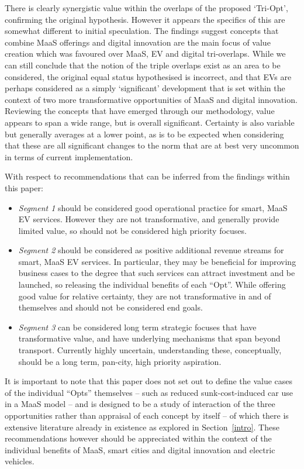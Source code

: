 \documentclass[journal]{IEEEtran}
\begin{document}
There is clearly synergistic value within the overlaps of the proposed
`Tri-Opt', confirming the original hypothesis. However it appears the
specifics of this are somewhat different to initial speculation. The
findings suggest concepts that combine MaaS offerings and digital
innovation are the main focus of value creation which was favoured
over MaaS, EV and digital tri-overlaps. While we can still conclude
that the notion of the triple overlaps exist as an area to be
considered, the original equal status hypothesised is incorrect, and
that EVs are perhaps considered as a simply `significant' development
that is set within the context of two more transformative
opportunities of MaaS and digital innovation. Reviewing the concepts
that have emerged through our methodology, value appears to span a
wide range, but is overall significant. Certainty is also variable but
generally averages at a lower point, as is to be expected when
considering that these are all significant changes to the norm that
are at best very uncommon in terms of current implementation.

With respect to recommendations that can be inferred from the findings
within this paper:

\begin{itemize}
\item {\emph{Segment 1}} should be considered good operational
practice for smart, MaaS EV services. However they are not
transformative, and generally provide limited value, so should not be
considered high priority focuses.
\item {\emph{Segment 2}} should be considered as positive additional
revenue streams for smart, MaaS EV services. In particular, they may
be beneficial for improving business cases to the degree that such
services can attract investment and be launched, so releasing the
individual benefits of each ``Opt''. While offering good value for
relative certainty, they are not transformative in and of themselves
and should not be considered end goals.
\item {\emph{Segment 3}} can be considered long term strategic focuses
that have transformative value, and have underlying mechanisms that
span beyond transport. Currently highly uncertain, understanding
these, conceptually, should be a long term, pan-city, high priority
  aspiration.
\end{itemize}

It is important to note that this paper does not set out to define the
value cases of the individual ``Opts'' themselves -- such as reduced
sunk-cost-induced car use in a MaaS model -- and is designed to be a
study of interaction of the three opportunities rather than appraisal
of each concept by itself -- of which there is extensive literature
already in existence as explored in Section~\ref{intro}. These
recommendations however should be appreciated within the context of
the individual benefits of MaaS, smart cities and digital innovation
and electric vehicles.
\end{document}
